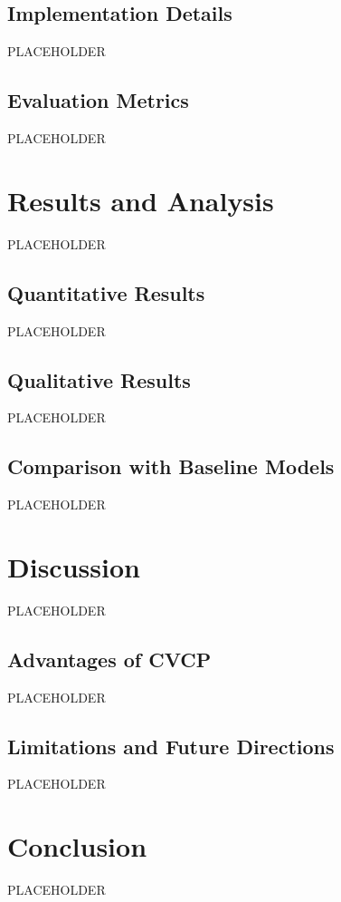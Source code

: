 \documentclass[twocolumn, times]{article}
\begin{document}
\subsection{Implementation Details}
PLACEHOLDER

\subsection{Evaluation Metrics}
PLACEHOLDER

\section{Results and Analysis}
PLACEHOLDER

\subsection{Quantitative Results}
PLACEHOLDER

\subsection{Qualitative Results}
PLACEHOLDER

\subsection{Comparison with Baseline Models}
PLACEHOLDER

\section{Discussion}
PLACEHOLDER

\subsection{Advantages of CVCP}
PLACEHOLDER

\subsection{Limitations and Future Directions}
PLACEHOLDER

\section{Conclusion}
PLACEHOLDER

% 
% 
\end{document}
